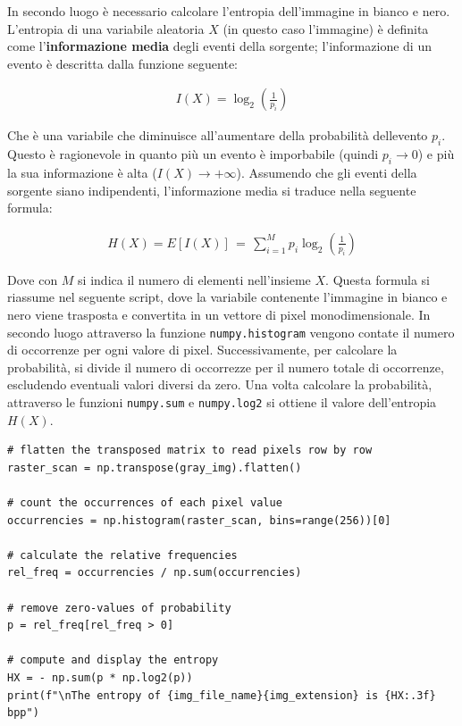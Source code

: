 \FloatBarrier\noindent In secondo luogo è necessario calcolare l'entropia dell'immagine in bianco e nero. L'entropia di una variabile aleatoria $X$ (in questo caso l'immagine) è definita come l'\textbf{informazione media} degli eventi della sorgente; l'informazione di un evento è descritta dalla funzione seguente:

\begin{gather*}
    I(X) = \log_2\left( \frac{1}{p_i} \right)
\end{gather*}

\noindent Che è una variabile che diminuisce all'aumentare della probabilità dellevento $p_i$. Questo è ragionevole in quanto più un evento è imporbabile (quindi $p_i \to 0$) e più la sua informazione è alta ($I(X) \to +\infty$). Assumendo che gli eventi della sorgente siano indipendenti, l'informazione media si traduce nella seguente formula:

\begin{gather*}
    H(X) = E[I(X)] \, = \, \sum_{i = 1}^M p_i\log_2\left( \frac{1}{p_i} \right)
\end{gather*}

\noindent Dove con $M$ si indica il numero di elementi nell'insieme $X$. Questa formula si riassume nel seguente script, dove la variabile contenente l'immagine in bianco e nero viene trasposta e convertita in un vettore di pixel monodimensionale. In secondo luogo attraverso la funzione \texttt{numpy.histogram} vengono contate il numero di occorrenze per ogni valore di pixel. Successivamente, per calcolare la probabilità, si divide il numero di occorrezze per il numero totale di occorrenze, escludendo eventuali valori diversi da zero. Una volta calcolare la probabilità, attraverso le funzioni  \texttt{numpy.sum} e \texttt{numpy.log2} si ottiene il valore dell'entropia $H(X)$.


\begin{lstlisting}
# flatten the transposed matrix to read pixels row by row
raster_scan = np.transpose(gray_img).flatten()

# count the occurrences of each pixel value
occurrencies = np.histogram(raster_scan, bins=range(256))[0]

# calculate the relative frequencies
rel_freq = occurrencies / np.sum(occurrencies)

# remove zero-values of probability
p = rel_freq[rel_freq > 0]

# compute and display the entropy
HX = - np.sum(p * np.log2(p))
print(f"\nThe entropy of {img_file_name}{img_extension} is {HX:.3f} bpp")
\end{lstlisting}

